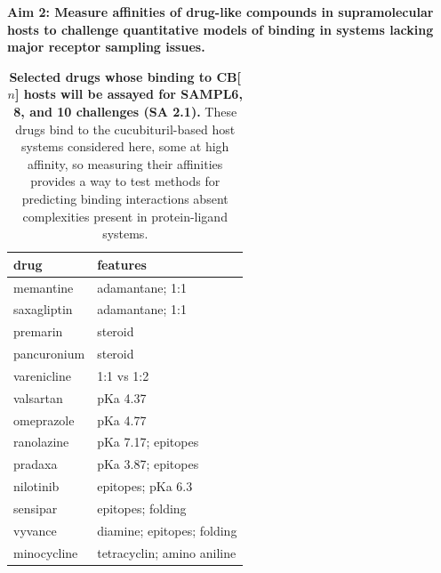 \documentclass[11pt]{article}
\begin{document}
\textbf{Aim 2: Measure affinities of drug-like compounds in supramolecular hosts to challenge quantitative models of binding in systems lacking major receptor sampling issues.}

\begin{table}
\footnotesize
\begin{tabular}{l | l}
{\bf drug} & {\bf features} \\
\hline
memantine & adamantane; 1:1 \\
saxagliptin & adamantane; 1:1 \\
premarin & steroid \\
pancuronium & steroid\\
varenicline & 1:1 vs 1:2 \\
valsartan & pKa 4.37 \\ 
omeprazole & pKa 4.77 \\
ranolazine & pKa 7.17; epitopes \\
pradaxa & pKa 3.87; epitopes \\
nilotinib & epitopes; pKa 6.3 \\
sensipar & epitopes; folding \\
vyvance & diamine; epitopes; folding \\
minocycline & tetracyclin; amino aniline \\
\end{tabular}
\caption{\label{table:CB} {\bf Selected drugs whose binding to CB[$n$] hosts will be assayed for SAMPL6, 8, and 10 challenges (SA 2.1).} These drugs bind to the cucubituril-based host systems considered here, some at high affinity, so measuring their affinities provides a way to test methods for predicting binding interactions absent complexities present in protein-ligand systems.
}
\end{table}
\end{document}
